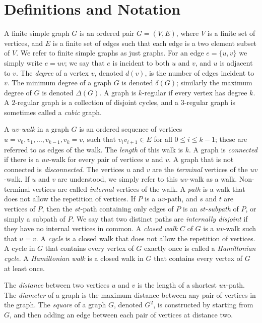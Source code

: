 \documentclass[12pt,letterpaper,oneside]{book}
\begin{document}
\newpage
\section{Definitions and Notation}

A finite simple graph $G$ is an ordered pair $G=(V,E)$, where $V$ is a finite 
set of vertices, and $E$ is a finite set of edges such that each edge is a two element subset of $V$.  We 
refer to finite simple graphs as just graphs.  
For an edge $e=\{u,v\}$ we simply write $e=uv$; we say that $e$ is incident 
to both $u$ and $v$, and $u$ is adjacent to $v$.  The \emph{degree} of a vertex $v$, denoted $d(v)$, is the number of edges incident to $v$.  
The minimum degree of a graph $G$ is denoted $\delta(G)$; similarly the maximum degree of $G$ is denoted $\Delta(G)$.  
A graph is $k$-regular if every vertex has degree $k$.  A $2$-regular graph is a collection 
of disjoint cycles, and a $3$-regular graph is sometimes called a \emph{cubic} graph.  

A $uv$-\emph{walk} 
in a graph $G$ is an ordered sequence of vertices 
$u=v_0, v_1, \ldots, v_{k-1}, v_k=v$, such that $v_iv_{i+1}\in E$ for 
all $0 \le i \le k-1$; these are referred to as edges of the walk.  
The \emph{length} of this walk is $k$.  A graph is \emph{connected} if there is a $uv$-walk for every pair of vertices 
$u$ and $v$.  A graph that is not connected is \emph{disconnected}.  
The vertices $u$ and $v$ are the \emph{terminal} vertices of the $uv$-walk.  
If $u$ and $v$ are understood, we simply refer to this $uv$-walk 
as a walk.  Non-terminal vertices are called \emph{internal} vertices of the walk.    
A \emph{path} is a walk that does not allow 
the repetition of vertices.   If $P$ is a $uv$-path, and $s$ and $t$ are vertices of $P$, then the $st$-path 
containing only edges of $P$ is an $st$-\emph{subpath} of $P$, or simply a subpath of $P$.  We say that 
two distinct paths are \emph{internally disjoint} if they have no internal vertices in common.  
A \emph{closed walk} $C$ of $G$ is a $uv$-walk such that $u=v$.  A \emph{cycle} is a closed walk that does 
not allow the repetition of vertices.  
A cycle in $G$ that 
contains every vertex of $G$ exactly once is called a \emph{Hamiltonian cycle}.  A \emph{Hamiltonian walk} is 
a closed walk in $G$ that 
contains every vertex of $G$ at least once.

The \emph{distance} between two vertices $u$ and $v$ is the 
length of a shortest $uv$-path.  The \emph{diameter} of a graph is the maximum distance between 
any pair of vertices in the graph.  
The \emph{square} of a graph $G$, denoted $G^2$, 
is constructed by starting  
from $G$, and then adding an edge between each pair of vertices at distance two.  
\end{document}
